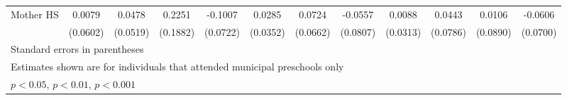 \begin{table}[htbp]
\begin{tabular}{l*{11}{c}}
\addlinespace
Mother HS   &      0.0079         &      0.0478         &      0.2251         &     -0.1007         &      0.0285         &      0.0724         &     -0.0557         &      0.0088         &      0.0443         &      0.0106         &     -0.0606         \\
            &    (0.0602)         &    (0.0519)         &    (0.1882)         &    (0.0722)         &    (0.0352)         &    (0.0662)         &    (0.0807)         &    (0.0313)         &    (0.0786)         &    (0.0890)         &    (0.0700)         \\
\bottomrule
\multicolumn{12}{l}{\footnotesize Standard errors in parentheses}\\
\multicolumn{12}{l}{\footnotesize Estimates shown are for individuals that attended municipal preschools only}\\
\multicolumn{12}{l}{\footnotesize \sym{*} \(p<0.05\), \sym{**} \(p<0.01\), \sym{***} \(p<0.001\)}\\
\end{tabular}
\end{table}

